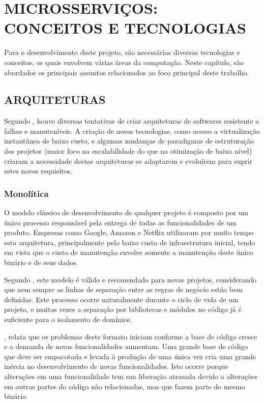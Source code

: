 \chapter{MICROSSERVIÇOS: CONCEITOS E TECNOLOGIAS}
\label{chp:tecnologias}

Para o desenvolvimento deste projeto, são necessárias diversas tecnologias e
conceitos, os quais envolvem várias áreas da computação. Neste capítulo, são
abordados os principais assuntos relacionados ao foco principal deste trabalho.

\section{ARQUITETURAS}

Segundo , houve diversas tentativas de criar
arquiteturas de softwares resistente a falhas e manuteníveis. A criação de
novas tecnologias, como acesso a virtualização instantânea de baixo custo,
e algumas mudanças de paradigmas de estruturação dos projetos (maior foco
na escalabilidade do que na otimização de baixo nível) criaram a
necessidade destas arquiteturas se adaptarem e evoluírem para suprir estes
novos requisitos.

\subsection{Monolítica}

O modelo clássico de desenvolvimento de qualquer projeto é composto por um
único processo responsável pela entrega de todas as funcionalidades de um
produto. Empresas como Google, Amazon e Netflix utilizaram por muito tempo
esta arquitetura, principalmente pelo baixo custo de infraestrutura inicial,
tendo em vista que o custo de manutenção envolve somente a manutenção deste
único binário e de seus dados.

Segundo , este modelo é válido e recomendado para novos
projetos, considerando que nem sempre as linhas de separação entre as regras
de negócio estão bem definidas. Este processo ocorre naturalmente durante o
ciclo de vida de um projeto, e muitas vezes a separação por bibliotecas e
módulos no código já é suficiente para o isolamento de domínios.

, relata que os problemas deste formato iniciam conforme
a base de código cresce e a demanda de novas funcionalidades aumentam. Uma
grande base de código que deve ser empacotada e levada à produção de uma
única vez cria uma grande inércia no desenvolvimento de novas
funcionalidades. Isto ocorre porque alterações em uma funcionalidade tem
sua liberação atrasada devido a alterações em outras partes do código não
relacionadas, mas que fazem parte do mesmo binário.

